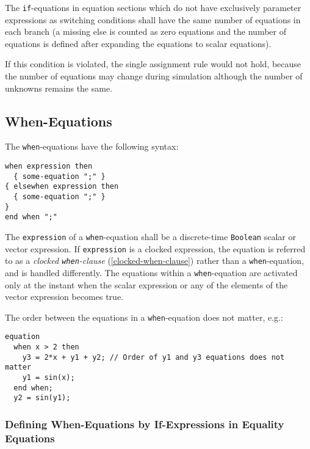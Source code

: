 The \lstinline!if!-equations in equation sections which do not have exclusively parameter expressions as switching conditions shall have the same number of equations in each branch (a missing else is counted as zero equations and the number of equations is defined after expanding the equations to scalar equations).

\begin{nonnormative}
If this condition is violated, the single assignment rule would not hold, because the number of equations may change during simulation although the number of unknowns remains the same.
\end{nonnormative}

\subsection{When-Equations}\label{when-equations}

The \lstinline!when!-equations have the following syntax:
\begin{lstlisting}[language=grammar]
when expression then
  { some-equation ";" }
{ elsewhen expression then
  { some-equation ";" }
}
end when ";"
\end{lstlisting}

The \lstinline!expression! of a \lstinline!when!-equation shall be a discrete-time \lstinline!Boolean! scalar or vector expression.
If \lstinline!expression! is a clocked expression, the equation is referred to as a \emph{clocked \lstinline!when!-clause} (\cref{clocked-when-clause}) rather than a \lstinline!when!-equation, and is handled differently.
The equations within a \lstinline!when!-equation are activated only at the instant when the scalar expression or any of the elements of the vector expression becomes true.

\begin{example}
The order between the equations in a \lstinline!when!-equation does not matter, e.g.:
\begin{lstlisting}[language=modelica]
equation
  when x > 2 then
    y3 = 2*x + y1 + y2; // Order of y1 and y3 equations does not matter
    y1 = sin(x);
  end when;
  y2 = sin(y1);
\end{lstlisting}
\end{example}

\subsubsection{Defining When-Equations by If-Expressions in Equality Equations}\label{defining-when-equations-by-if-expressions-in-equality-equations}

